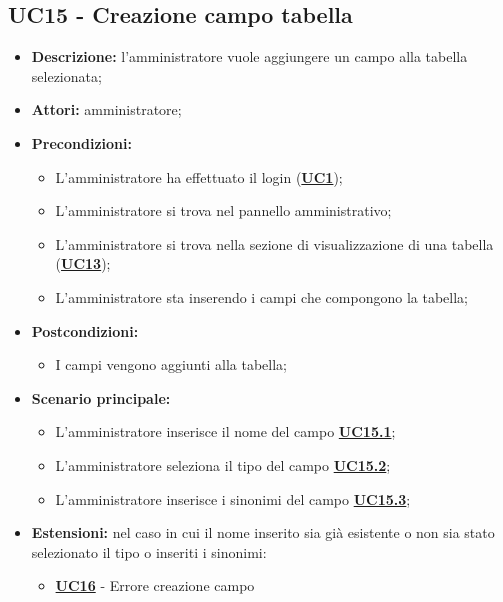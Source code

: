 \subsection{UC15 - Creazione campo tabella}
\label{sec:UC15}
\begin{itemize}
	\item \textbf{Descrizione:} l’amministratore vuole aggiungere un campo alla tabella selezionata;
	\item \textbf{Attori:} amministratore;
	\item \textbf{Precondizioni:} 
	\begin{itemize}
		\item L’amministratore ha effettuato il login (\hyperref[sec:UC1]{\textbf{UC1}});
		\item L’amministratore si trova nel pannello amministrativo;
		\item L’amministratore si trova nella sezione di visualizzazione di una tabella (\hyperref[sec:UC13]{\textbf{UC13}});
		\item L’amministratore sta inserendo i campi che compongono la tabella;
	\end{itemize}
	\item \textbf{Postcondizioni:} 
	\begin{itemize}
		\item I campi vengono aggiunti alla tabella;
	\end{itemize}
	\item \textbf{Scenario principale:} 
	\begin{itemize}
		\item L’amministratore inserisce il nome del campo \hyperref[sec:UC15.1]{\textbf{UC15.1}};
		\item L'amministratore seleziona il tipo del campo \hyperref[sec:UC15.2]{\textbf{UC15.2}};
		\item L'amministratore inserisce i sinonimi del campo \hyperref[sec:UC15.3]{\textbf{UC15.3}};
	\end{itemize}
	\item \textbf{Estensioni:} nel caso in cui il nome inserito sia già esistente o non sia stato selezionato il tipo o inseriti i sinonimi:
	\begin{itemize}
		\item \hyperref[sec:UC16]{\textbf{UC16}} - Errore creazione campo
	\end{itemize}
\end{itemize}

